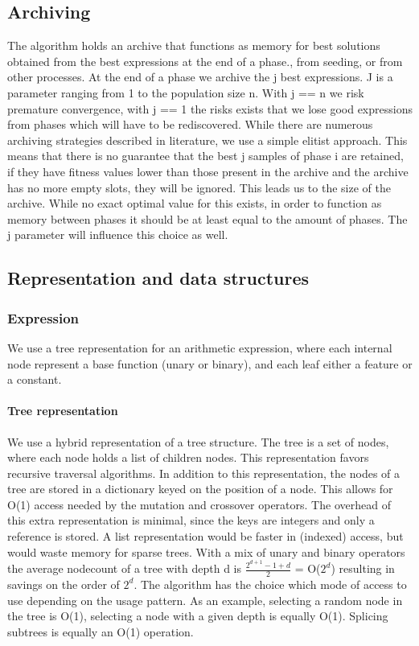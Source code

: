 \subsection{Archiving}
The algorithm holds an archive that functions as memory for best solutions obtained from the best expressions at the end of a phase., from seeding, or from other processes.
At the end of a phase we archive the j best expressions. J is a parameter ranging from 1 to the population size n. With j == n we risk premature convergence, with j == 1 the risks exists that we lose good expressions from phases which will have to be rediscovered.
While there are numerous archiving strategies described in literature, we use a simple elitist approach. This means that there is no guarantee that the best j samples of phase i are retained, if they have fitness values lower than those present in the archive and the archive has no more empty slots, they will be ignored.
This leads us to the size of the archive. While no exact optimal value for this exists, in order to function as memory between phases it should be at least equal to the amount of phases. The j parameter will influence this choice as well.

\subsection{Representation and data structures}\label{subsectree}
\subsubsection{Expression}
We use a tree representation for an arithmetic expression, where each internal node represent a base function (unary or binary), and each leaf either a feature or a constant.

\paragraph{Tree representation}
We use a hybrid representation of a tree structure. The tree is a set of nodes, where each node holds a list of children nodes. This representation favors recursive traversal algorithms. In addition to this representation, the nodes of a tree are stored in a dictionary keyed on the position of a node. This allows for O(1) access needed by the mutation and crossover operators. The overhead of this extra representation is minimal, since the keys are integers and only a reference is stored. A list representation would be faster in (indexed) access, but would waste memory for sparse trees. With a mix of unary and binary operators the average nodecount of a tree with depth d is $\frac{2^{d+1}-1  + d}{2}$ = O($2^d$) resulting in savings on the order of $2^d$.
The algorithm has the choice which mode of access to use depending on the usage pattern. As an example, selecting a random node in the tree is O(1), selecting a node with a given depth is equally O(1). Splicing subtrees is equally an O(1) operation.

